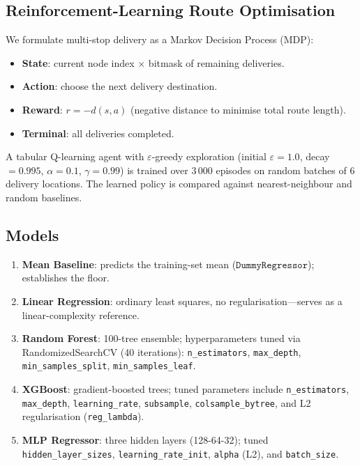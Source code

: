 \documentclass[conference]{IEEEtran}
\begin{document}
\subsection{Reinforcement-Learning Route Optimisation}
\label{sec:rl}

We formulate multi-stop delivery as a Markov Decision Process (MDP):
\begin{itemize}
    \item \textbf{State}: current node index $\times$ bitmask of remaining
          deliveries.
    \item \textbf{Action}: choose the next delivery destination.
    \item \textbf{Reward}: $r = -d(s, a)$ (negative distance to minimise
          total route length).
    \item \textbf{Terminal}: all deliveries completed.
\end{itemize}

A tabular Q-learning agent with $\varepsilon$-greedy exploration (initial
$\varepsilon = 1.0$, decay $= 0.995$, $\alpha = 0.1$, $\gamma = 0.99$) is
trained over 3\,000 episodes on random batches of 6 delivery locations.  The
learned policy is compared against nearest-neighbour and random baselines.

\subsection{Models}
\label{sec:models}

\begin{enumerate}
    \item \textbf{Mean Baseline}: predicts the training-set mean
          ($\texttt{DummyRegressor}$); establishes the floor.
    \item \textbf{Linear Regression}: ordinary least squares, no
          regularisation—serves as a linear-complexity reference.
    \item \textbf{Random Forest}: 100-tree ensemble; hyperparameters tuned via
          RandomizedSearchCV (40 iterations): \texttt{n\_estimators},
          \texttt{max\_depth}, \texttt{min\_samples\_split},
          \texttt{min\_samples\_leaf}.
    \item \textbf{XGBoost}: gradient-boosted trees; tuned parameters include
          \texttt{n\_estimators}, \texttt{max\_depth},
          \texttt{learning\_rate}, \texttt{subsample},
          \texttt{colsample\_bytree}, and L2 regularisation
          (\texttt{reg\_lambda}).
    \item \textbf{MLP Regressor}: three hidden layers (128-64-32); tuned
          \texttt{hidden\_layer\_sizes}, \texttt{learning\_rate\_init},
          \texttt{alpha} (L2), and \texttt{batch\_size}.
\end{enumerate}
\end{document}
